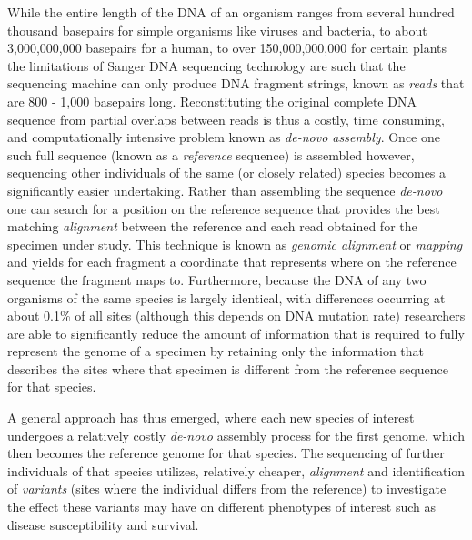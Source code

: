 While the entire length of the DNA of an organism ranges from several hundred thousand basepairs for simple organisms like viruses and bacteria, to about 3,000,000,000 basepairs for a human, to over 150,000,000,000 for certain plants\autocite{pellicer2010largest} the limitations of Sanger DNA sequencing technology are such that the sequencing machine can only produce DNA fragment strings, known as \emph{reads} that are 800 - 1,000 basepairs long\autocite{sanger1977dna}. Reconstituting the original complete DNA sequence from partial overlaps between reads is thus a costly, time consuming, and computationally intensive problem known as \emph{de-novo assembly}\autocite{zerbino2008velvet}. Once one such full sequence (known as a \emph{reference} sequence) is assembled however, sequencing other individuals of the same (or closely related) species becomes a significantly easier undertaking. Rather than assembling the sequence \emph{de-novo} one can search for a position on the reference sequence that provides the best matching \emph{alignment} between the reference and each read obtained for the specimen under study. This technique is known as \emph{genomic alignment}\autocite{li2009fast} or \emph{mapping} and yields for each fragment a coordinate that represents where on the reference sequence the fragment maps to. Furthermore, because the DNA of any two organisms of the same species is largely identical, with differences occurring at about 0.1\% of all sites (although this depends on DNA mutation rate)\autocite{nachman2001single} researchers are able to significantly reduce the amount of information that is required to fully represent the genome of a specimen by retaining only the information that describes the sites where that specimen is different from the reference sequence for that species. 

A general approach has thus emerged, where each new species of interest undergoes a relatively costly \emph{de-novo} assembly process for the first genome, which then becomes the reference genome for that species. The sequencing of further individuals of that species utilizes, relatively cheaper, \emph{alignment} and identification of \emph{variants} (sites where the individual differs from the reference) to investigate the effect these variants may have on different phenotypes of interest such as disease susceptibility and survival\autocite{manolio2010genomewide}.

